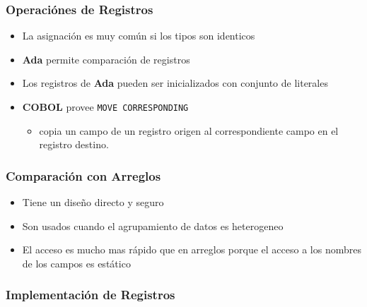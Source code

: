 \documentclass[11pt]{article}
\begin{document}
\subsubsection*{Operaciónes de Registros}
\label{sec:orgheadline34}
\begin{itemize}
\item La asignación es muy común si los tipos son identicos
\item \textbf{Ada} permite comparación de registros
\item Los registros de \textbf{Ada} pueden ser inicializados con conjunto de literales
\item \textbf{COBOL} provee \texttt{MOVE CORRESPONDING}
\begin{itemize}
\item copia un campo de un registro origen al correspondiente campo en
el registro destino.
\end{itemize}
\end{itemize}

\subsubsection*{Comparación con Arreglos}
\label{sec:orgheadline35}
\begin{itemize}
\item Tiene un diseño directo y seguro
\item Son usados cuando el agrupamiento de datos es heterogeneo
\item El acceso es mucho mas rápido que en arreglos porque el acceso a los
nombres de los campos es estático
\end{itemize}

\subsubsection*{Implementación de Registros}
\label{sec:orgheadline36}
\end{document}
